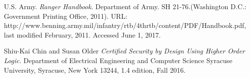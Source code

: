 \begin{thebibliography}{9}
  U.S. Army.
  \textit{Ranger Handbook}.
  Department of Army. SH 21-76.(Washington D.C.: Government Printing Office, 2011).
  URL: http://www.benning.army.mil/infantry/rtb/4thrtb/content/PDF/Handbook.pdf,
  last modified February, 2011. Accessed June 1, 2017.
  
  Shiu-Kai Chin and Susan Older
  \textit{Certified Security by Design Using Higher Order Logic}.
  Department of Electrical Engineering and Computer Science Syracuse University, Syracuse, New York 13244, 1.4 edition, Fall 2016.
\end{thebibliography}
